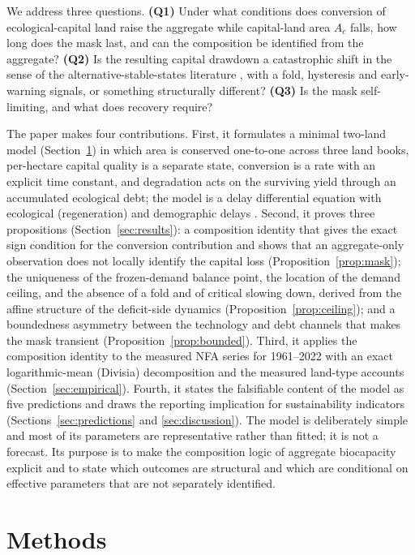 \documentclass[preprint,12pt,authoryear]{elsarticle}
\begin{document}
We address three questions. \textbf{(Q1)} Under what conditions does conversion of ecological-capital land raise the aggregate while capital-land area $A_c$ falls, how long does the mask last, and can the composition be identified from the aggregate? \textbf{(Q2)} Is the resulting capital drawdown a catastrophic shift in the sense of the alternative-stable-states literature \citep{Scheffer2001}, with a fold, hysteresis and early-warning signals, or something structurally different? \textbf{(Q3)} Is the mask self-limiting, and what does recovery require?

The paper makes four contributions. First, it formulates a minimal two-land model (Section~\ref{sec:model}) in which area is conserved one-to-one across three land books, per-hectare capital quality is a separate state, conversion is a rate with an explicit time constant, and degradation acts on the surviving yield through an accumulated ecological debt; the model is a delay differential equation with ecological (regeneration) and demographic delays \citep{Kuang1993,Hutchinson1948}. Second, it proves three propositions (Section~\ref{sec:results}): a composition identity that gives the exact sign condition for the conversion contribution and shows that an aggregate-only observation does not locally identify the capital loss (Proposition~\ref{prop:mask}); the uniqueness of the frozen-demand balance point, the location of the demand ceiling, and the absence of a fold and of critical slowing down, derived from the affine structure of the deficit-side dynamics (Proposition~\ref{prop:ceiling}); and a boundedness asymmetry between the technology and debt channels that makes the mask transient (Proposition~\ref{prop:bounded}). Third, it applies the composition identity to the measured NFA series for 1961--2022 with an exact logarithmic-mean (Divisia) decomposition and the measured land-type accounts (Section~\ref{sec:empirical}). Fourth, it states the falsifiable content of the model as five predictions and draws the reporting implication for sustainability indicators (Sections~\ref{sec:predictions} and \ref{sec:discussion}). The model is deliberately simple and most of its parameters are representative rather than fitted; it is not a forecast. Its purpose is to make the composition logic of aggregate biocapacity explicit and to state which outcomes are structural and which are conditional on effective parameters that are not separately identified.
\section{Methods}\label{sec:model}
\end{document}
